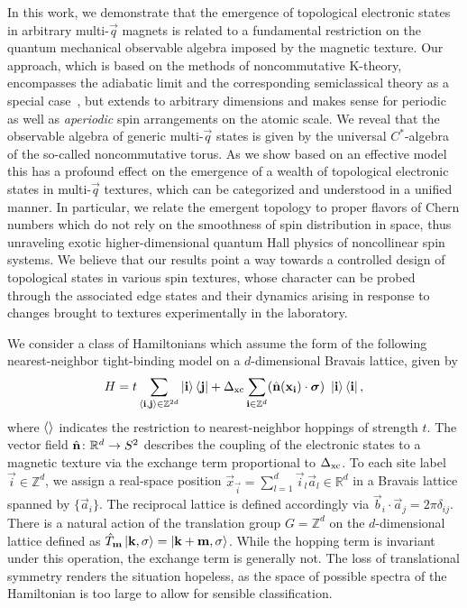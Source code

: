 \documentclass[
    10pt,
    aps,
    prl,
    twocolumn,
    floatfix,
    superscriptaddress
]{revtex4-2}
\begin{document}
In this work, we demonstrate that the emergence of topological electronic states in arbitrary multi-$\vec{q}$ magnets is related to a fundamental restriction on the quantum mechanical observable algebra imposed by the magnetic texture. 
Our approach, which is based on the methods of noncommutative K-theory, encompasses the adiabatic limit and the corresponding semiclassical theory as a special case~\cite{Su2020}, but extends 
to arbitrary dimensions and makes sense for periodic as well as {\it aperiodic} spin arrangements on the atomic scale.
We reveal that the observable algebra of generic multi-$\vec{q}$ states is given by the universal $C^\ast$-algebra of the so-called noncommutative torus. 
As we show based on an effective model this has a profound effect on the emergence of a wealth of topological electronic states in multi-$\vec{q}$ textures, which can be categorized and understood in a unified manner. 
In particular, we relate the emergent topology to proper flavors of Chern numbers which do not rely on the smoothness of spin distribution in space, thus unraveling  exotic higher-dimensional quantum Hall physics of noncollinear spin systems.
We believe that our results point a way towards a controlled design of topological states in various spin textures, whose character can be probed through the associated edge states and their dynamics arising in response to changes brought to textures experimentally in the laboratory. 



We consider a class of Hamiltonians which assume the form of the following nearest-neighbor tight-binding model on a $d$-dimensional Bravais lattice, given by
\begin{align}
    H  = t \sum_{\braket{\mathbf{i},\mathbf{j}} \in \mathbb{Z}^{2d}} \ket{\mathbf{i}}\bra{\mathbf{j}}
    + \Delta_\mathrm{xc}\sum_{\mathbf{i} \in \mathbb{Z}^d}  (\hat{\mathbf{n}} (\mathbf{x}_{\mathbf{i}}) \cdot \boldsymbol{\sigma}) ~ \ket{\mathbf{i}}\bra{\mathbf{i}} ,
    \label{eq:hamiltonian}
\end{align}
where $\braket{}$ indicates the restriction to nearest-neighbor hoppings of strength $t$.
The vector field $\hat{\mathbf{n}}\colon \mathbb{R}^d \to S^2$ describes the coupling of the electronic states to a magnetic texture via the exchange term proportional to $\Delta_\mathrm{xc}$. 
To each site label $\vec{i} \in \mathbb{Z}^d$, we assign a real-space position $\vec{x}_\vec{i} = \sum_{l=1}^d \vec{i}_l \vec{a}_l \in \mathbb{R}^d$ in a Bravais lattice spanned by $\lbrace \vec{a}_i \rbrace$. 
The reciprocal lattice is defined accordingly via $ \vec{b}_i \cdot \vec{a}_j  = 2\pi \delta_{ij}$.
There is a natural action of the translation group $G = \mathbb{Z}^d$ on the $d$-dimensional lattice defined as
$
    \hat{T}_{\mathbf{m}} \ket{\mathbf{k}, \sigma}  =  \ket{\mathbf{k}+ \mathbf{m}, \sigma}
$.
While the hopping term is invariant under this operation, the exchange term is generally not.
The loss of translational symmetry renders the situation hopeless, as the space of possible spectra of the Hamiltonian is too large to allow for sensible classification.
\end{document}
